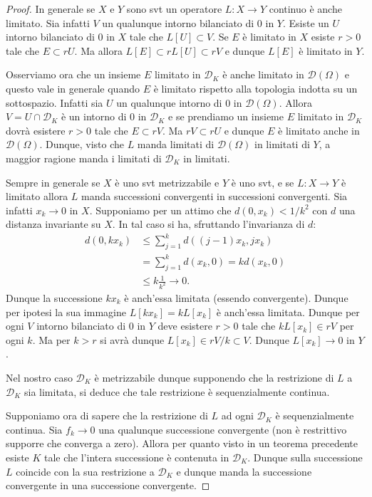 \documentclass[italian,a4paper,oneside,headinclude]{scrbook}
\newcommand{\D}{\mathcal D}
\begin{document}
\begin{proof}
  In generale se $X$ e $Y$ sono svt un operatore $L\colon X\to Y$
  continuo è anche limitato. Sia infatti $V$ un qualunque intorno
  bilanciato di $0$ in $Y$. Esiste un $U$ intorno bilanciato di $0$ in
  $X$ tale che $L[U]\subset V$. Se $E$ è limitato in $X$ esiste $r>0$
  tale che $E \subset r U$. Ma allora $L[E] \subset rL[U] \subset r V$
  e dunque $L[E]$ è limitato in $Y$.

  Osserviamo ora che un insieme $E$ limitato in $\D_K$ è anche
  limitato in $\D(\Omega)$ e questo vale in generale quando $E$ è
  limitato rispetto alla topologia indotta su un sottospazio.
  Infatti sia $U$ un
  qualunque intorno di $0$ in $\D(\Omega)$.
  Allora $V=U\cap \D_K$ è un intorno di $0$ in $\D_K$ e se prendiamo
  un insieme $E$ limitato in $\D_K$ dovrà esistere $r>0$ tale che
  $E\subset r V$. Ma $rV \subset rU$ e dunque $E$ è limitato anche in
  $\D(\Omega)$. Dunque, visto che $L$ manda limitati di $\D(\Omega)$
  in limitati di $Y$, a maggior ragione manda i limitati di $\D_K$ in
  limitati.

  Sempre in generale se $X$ è uno svt metrizzabile e $Y$ è uno svt,
  e se $L\colon X\to Y$ è
  limitato allora $L$ manda successioni convergenti in successioni
  convergenti.
  Sia infatti $x_k\to 0$ in $X$. Supponiamo per un attimo che
  $d(0,x_k) < 1/k^2$ con $d$ una distanza invariante su $X$.
  In tal caso si ha,
  sfruttando l'invarianza di $d$:
  \begin{align*}
    d(0, k x_k)
    &\le \sum_{j=1}^k
    d((j-1)x_k,jx_k) \\
    & = \sum_{j=1}^k d(x_k,0)
    = k d(x_k,0)\\
    & \le k\frac{1}{k^2} \to 0.
  \end{align*}
  Dunque la successione $kx_k$ è anch'essa limitata (essendo
  convergente). Dunque per ipotesi la sua immagine
  $L[kx_k] = k  L[x_k]$
  è anch'essa limitata. Dunque per ogni $V$ intorno bilanciato
  di $0$ in $Y$ deve esistere $r>0$ tale che $k L[x_k] \in r V$ per
  ogni $k$. Ma per $k>r$ si avrà dunque
  $L[x_k] \in rV/k \subset V$.
  Dunque $L[x_k]\to 0$ in $Y$.

  Nel nostro caso $\D_K$ è metrizzabile dunque supponendo che la
  restrizione di $L$ a $\D_K$ sia limitata, si deduce che tale
  restrizione è sequenzialmente continua.

  Supponiamo ora di sapere che la restrizione di $L$ ad ogni $\D_K$ è
  sequenzialmente continua. Sia $f_k\to 0$ una qualunque successione
  convergente (non è restrittivo supporre che converga a zero). Allora
  per quanto visto in un teorema precedente esiste $K$ tale che
  l'intera successione è contenuta in $\D_K$. Dunque sulla successione
  $L$ coincide con la sua restrizione a $\D_K$ e dunque manda la
  successione convergente in una successione convergente.


\end{proof}
\end{document}
